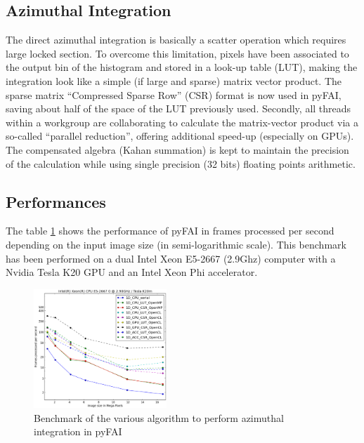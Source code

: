 \documentclass[preprint]{iucr}
\begin{document}
\subsection{Azimuthal Integration}
The direct azimuthal integration is basically a scatter operation which
requires large locked section.
To overcome this limitation, pixels have been
associated to the output bin of the histogram and stored in a look-up
table (LUT), making the integration look like a simple (if large and sparse)
matrix vector product.
The sparse matrix ``Compressed Sparse Row'' (CSR) format is now used in pyFAI,
saving about half of the space of the LUT previously used.
Secondly, all threads within a workgroup are collaborating to calculate the
matrix-vector product via a so-called ``parallel reduction'', offering
additional speed-up (especially on GPUs).
The compensated algebra (Kahan summation) is kept to maintain the precision
of the calculation while using single precision (32 bits) floating points
arithmetic. 

\subsection{Performances}
The table \ref{benchmark} shows the performance of pyFAI in frames processed per
second depending on the input image size (in semi-logarithmic scale). 
This
benchmark has been performed on a dual Intel Xeon E5-2667 (2.9Ghz) computer with a Nvidia Tesla K20 GPU and an Intel
Xeon Phi accelerator.

\begin{figure}
\label{benchmark}
\begin{center}
\includegraphics[width=5cm]{benchmark.eps}
\caption{Benchmark of the various algorithm to perform azimuthal integration in
pyFAI}
\end{center}
\end{figure}
\end{document}
